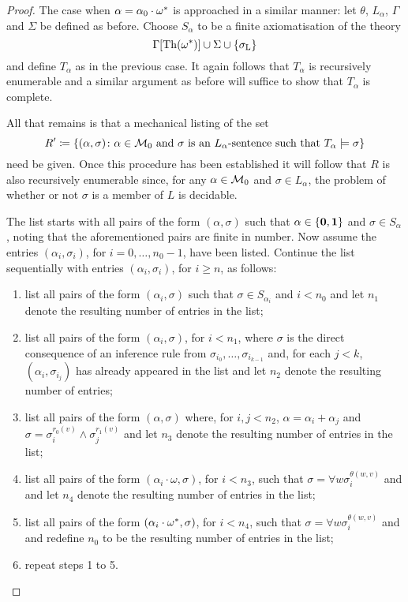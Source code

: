 \begin{proof}
	The case when $\alpha=\alpha_0\cdot{\omega}^\ast$ is approached in a similar manner: let $\theta$, $L_\alpha$, $\Gamma$ and $\Sigma$ be defined as before.  Choose $S_\alpha$ to be a finite axiomatisation of the theory
	\begin{equation}
		\Gamma[\operatorname{Th}({\omega}^\ast)]\cup\Sigma\cup\left\lbrace \sigma_{\mathrm{L}}\right\rbrace
	\end{equation}
	and define $T_\alpha$ as in the previous case.  It again follows that $T_\alpha$ is recursively enumerable and a similar argument as before will suffice to show that $T_\alpha$ is complete.

	All that remains is that a mechanical listing of the set
	\begin{equation}
		R^\prime\coloneqq\left\lbrace (\alpha,\sigma)\colon \alpha\in\mathcal{M}_0\text{ and }\sigma\text{ is an }L_\alpha\text{-sentence such that }T_\alpha\models\sigma \right\rbrace
	\end{equation}
	need be given.  Once this procedure has been established it will follow that $R$ is also recursively enumerable since, for any $\alpha\in\mathcal{M}_0$ and $\sigma\in L_\alpha$, the problem of whether or not $\sigma$ is a member of $L$ is decidable.

	The list starts with all pairs of the form $(\alpha,\sigma)$ such that $\alpha\in\left\lbrace \mathbf{0},\mathbf{1}\right\rbrace$ and $\sigma\in S_\alpha$, noting that the aforementioned pairs are finite in number.  Now assume the entries $(\alpha_i,\sigma_i)$, for $i=0,\dotsc,n_0-1$, have been listed.  Continue the list sequentially with entries $(\alpha_i,\sigma_i)$, for $i\geq n$, as follows:
	\begin{enumerate}
		\item 	list all pairs of the form $(\alpha_i,\sigma)$ such that $\sigma\in S_{\alpha_i}$ and $i<n_0$ and let $n_1$ denote the resulting number of entries in the list;
		\item 	list all pairs of the form $(\alpha_i, \sigma)$, for $i<n_1$, where $\sigma$ is the direct consequence of an inference rule from $\sigma_{i_0},\dotsc,\sigma_{i_{k-1}}$ and, for each $j<k$, $(\alpha_i,\sigma_{i_j})$ has already appeared in the list and let $n_2$ denote the resulting number of entries;
		\item	list all pairs of the form $(\alpha,\sigma)$ where, for $i,j<n_2$, $\alpha=\alpha_i+\alpha_j$ and $\sigma=\sigma_i^{r_0(v)}\wedge\sigma_j^{r_1(v)}$ and let $n_3$ denote the resulting number of entries in the list;
		\item	list all pairs of the form $(\alpha_i\cdot\omega,\sigma)$, for $i<n_3$, such that $\sigma=\forall w\sigma_i^{\theta(w,v)}$ and and let $n_4$ denote the resulting number of entries in the list;
		\item	list all pairs of the form $(\alpha_i\cdot{\omega}^\ast,\sigma)$, for $i<n_4$, such that $\sigma=\forall w\sigma_i^{\theta(w,v)}$ and and redefine $n_0$ to be the resulting number of entries in the list;
		\item	repeat steps 1 to 5.
	\end{enumerate}


\end{proof}
